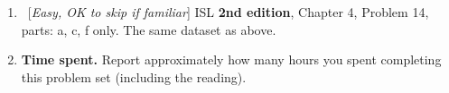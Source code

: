 \documentclass[letterpaper]{article}
\begin{document}
\begin{enumerate}
\item \ [\emph{Easy, OK to skip if familiar}] \label{item:easy-2} ISL \textbf{2nd edition}, Chapter 4, Problem 14, parts: a, c, f only. The same dataset as above.

  
\item \textbf{Time spent.} Report approximately how many hours you spent completing this problem set (including the reading).
\end{enumerate}
\end{document}
